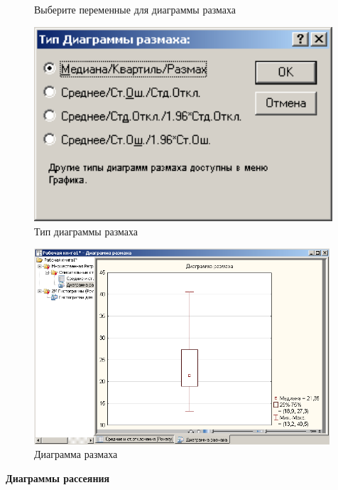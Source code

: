 \begin{figure}[!h]
\begin{minipage}{0.32\textwidth}
    \caption{Выберите переменные для диаграммы размаха}
    \label{fig:example_11}
  \end{minipage}
  \begin{minipage}{0.32\textwidth}
    \centering

    \includegraphics[width=0.99\textwidth]
    {inc/example_12.PNG}

    \caption{Тип диаграммы размаха}
    \label{fig:example_12}
  \end{minipage}
\end{figure}

\begin{figure}[!h]
  \centering

  \includegraphics[width=11cm]
  {inc/example_13.PNG}

  \caption{Диаграмма размаха}

  \label{fig:example_13}
\end{figure}

\newpage

\begin{center}
  \textbf{Диаграммы рассеяния}
\end{center}

